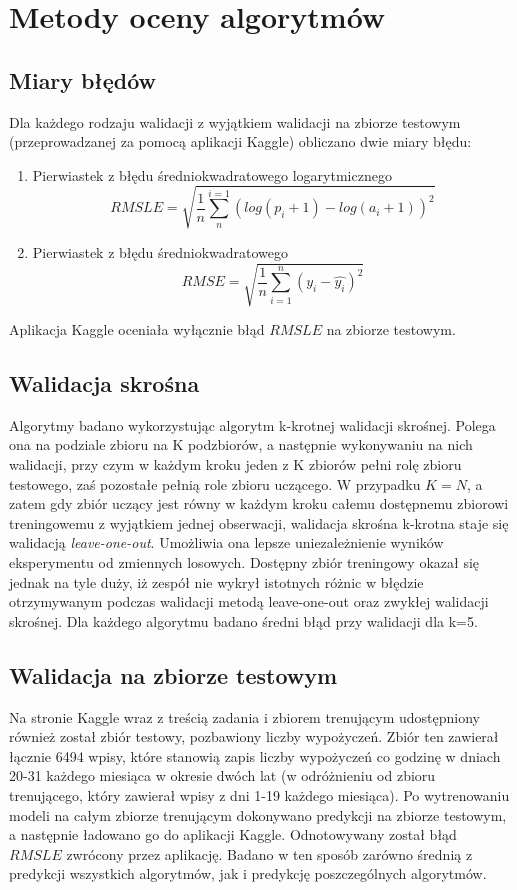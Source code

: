 \documentclass[a4paper,12pt]{article}
\begin{document}
\section{Metody oceny algorytmów}

    \subsection{Miary błędów}
    Dla każdego rodzaju walidacji z wyjątkiem walidacji na zbiorze testowym (przeprowadzanej za pomocą aplikacji Kaggle) obliczano dwie miary błędu:
    \begin{enumerate}
        \item Pierwiastek z błędu średniokwadratowego logarytmicznego $$RMSLE = \sqrt{\frac{1}{n}\sum_{n}^{i=1}(log(p_i + 1) - log(a_i + 1))^2}$$

        \item Pierwiastek z błędu średniokwadratowego $$RMSE = \sqrt{\frac{1}{n}\sum_{i=1}^{n}(y_i - \hat{y_i})^2}$$
     \end{enumerate}
    Aplikacja Kaggle oceniała wyłącznie błąd $RMSLE$ na zbiorze testowym.
    
    \subsection{Walidacja skrośna}
    Algorytmy badano wykorzystując algorytm k-krotnej walidacji skrośnej. Polega ona na podziale zbioru na K podzbiorów, a następnie wykonywaniu na nich 
    walidacji, przy czym w każdym kroku jeden z K zbiorów pełni rolę zbioru testowego, zaś pozostałe pełnią role zbioru uczącego. W przypadku $ K = N$, a zatem gdy zbiór uczący jest równy w każdym kroku całemu dostępnemu zbiorowi treningowemu z wyjątkiem jednej obserwacji, walidacja skrośna k-krotna staje się walidacją \textit{leave-one-out}. Umożliwia ona lepsze uniezależnienie wyników eksperymentu od zmiennych losowych. Dostępny zbiór treningowy okazał się jednak na tyle duży, iż zespół nie wykrył istotnych różnic w błędzie otrzymywanym podczas walidacji metodą leave-one-out oraz zwykłej walidacji skrośnej. Dla każdego algorytmu 
    badano średni błąd przy walidacji dla k=5.
    \subsection{Walidacja na zbiorze testowym}       
    Na stronie Kaggle wraz z treścią zadania i zbiorem trenującym udostępniony również został zbiór testowy, pozbawiony liczby wypożyczeń. 
    Zbiór ten zawierał łącznie 6494 wpisy, które stanowią zapis liczby wypożyczeń co godzinę w dniach 20-31 każdego miesiąca w okresie dwóch lat
    (w odróżnieniu od zbioru trenującego, który zawierał wpisy z dni 1-19 każdego miesiąca).
    Po wytrenowaniu
    modeli na całym zbiorze trenującym dokonywano predykcji na zbiorze testowym, a następnie ładowano go do aplikacji Kaggle. Odnotowywany został błąd 
    $RMSLE$ zwrócony przez aplikację. Badano w ten sposób zarówno średnią z predykcji wszystkich algorytmów, jak i predykcję poszczególnych algorytmów.
    
\end{document}
